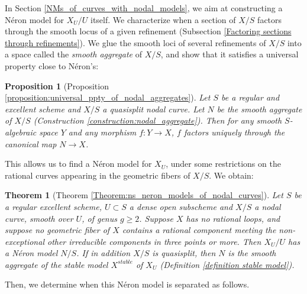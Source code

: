\documentclass[a4paper,12pt]{amsart} %
\numberwithin{equation}{subsection}
\theoremstyle{definition}
\theoremstyle{plain}%
\newtheorem{proposition}[definition]{Proposition}
\newtheorem{theorem}[definition]{Theorem}
\theoremstyle{remark}
\begin{document}
In Section \ref{NMs_of_curves_with_nodal_models}, we aim at constructing a Néron model for $X_U/U$ itself. We characterize when a section of $X/S$ factors through the smooth locus of a given refinement (Subsection \ref{Factoring sections through refinements}). We glue the smooth loci of several refinements of $X/S$ into a space called the \emph{smooth aggregate} of $X/S$, and show that it satisfies a universal property close to Néron's:

\begin{proposition}[Proposition \ref{proposition:universal_ppty_of_nodal_aggregates}]
Let $S$ be a regular and excellent scheme and $X/S$ a quasisplit nodal curve. Let $N$ be the smooth aggregate of $X/S$ (Construction \ref{construction:nodal_aggregate}). Then for any smooth $S$-algebraic space $Y$ and any morphism $f\colon Y\to X$, $f$ factors uniquely through the canonical map $N\to X$.
\end{proposition}

This allows us to find a Néron model for $X_U$, under some restrictions on the rational curves appearing in the geometric fibers of $X/S$. We obtain:

\begin{theorem}[Theorem \ref{Theorem:ns_neron_models_of_nodal_curves}]
Let $S$ be a regular excellent scheme, $U\subset S$ a dense open subscheme and $X/S$ a nodal curve, smooth over $U$, of genus $g\geq 2$. Suppose $X$ has no rational loops, and suppose no geometric fiber of $X$ contains a rational component meeting the non-exceptional other irreducible components in three points or more. Then $X_U/U$ has a N\'eron model $N/S$. If in addition $X/S$ is quasisplit, then $N$ is the smooth aggregate of the stable model $X^{stable}$ of $X_U$ (Definition \ref{definition stable model}).
\end{theorem}

Then, we determine when this Néron model is separated as follows.
\end{document}
